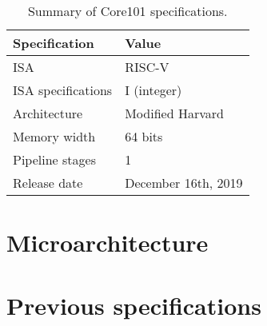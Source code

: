 \documentclass{article}
\begin{document}
\begin{table}[h]
    \centering
    \begin{tabular}{|l|l|}
        \hline
        \textbf{Specification}  &   \textbf{Value}      \\  \hline
        ISA                     &   RISC-V              \\  \hline
        ISA specifications      &   I (integer)         \\  \hline
        Architecture            &   Modified Harvard    \\  \hline
        Memory width            &   64 bits             \\  \hline
        Pipeline stages         &   1                   \\  \hline
        Release date            &   December 16th, 2019 \\  \hline
        
    \end{tabular}
    \caption{Summary of Core101 specifications.}
    \label{tab:specs0}
\end{table}

\section{Microarchitecture}

\appendix
\section{Previous specifications}
\end{document}
